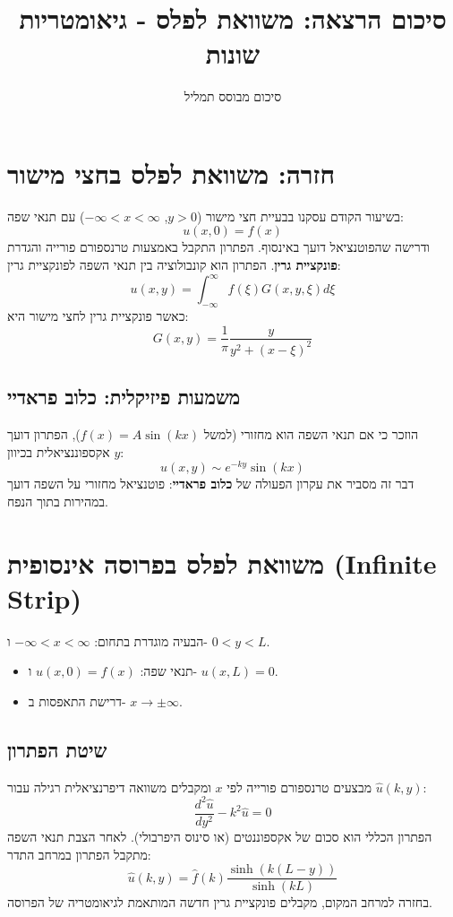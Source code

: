 \documentclass{article}
\title{סיכום הרצאה: משוואת לפלס - גיאומטריות שונות}
\author{סיכום מבוסס תמליל}
\date{}
\begin{document}
\maketitle

\section{חזרה: משוואת לפלס בחצי מישור}
בשיעור הקודם עסקנו בבעיית חצי מישור ($y > 0$, $-\infty < x < \infty$) עם תנאי שפה:
$$ u(x,0) = f(x) $$
ודרישה שהפוטנציאל דועך באינסוף.
הפתרון התקבל באמצעות טרנספורם פורייה והגדרת \textbf{פונקציית גרין}. הפתרון הוא קונבולוציה בין תנאי השפה לפונקציית גרין:
\begin{equation}
    u(x,y) = \int_{-\infty}^{\infty} f(\xi) G(x,y,\xi) d\xi
\end{equation}
כאשר פונקציית גרין לחצי מישור היא:
\begin{equation}
    G(x,y) = \frac{1}{\pi} \frac{y}{y^2 + (x-\xi)^2}
\end{equation}

\subsection{משמעות פיזיקלית: כלוב פראדיי}
הוזכר כי אם תנאי השפה הוא מחזורי (למשל $f(x) = A \sin(kx)$), הפתרון דועך אקספוננציאלית בכיוון $y$:
$$ u(x,y) \sim e^{-ky} \sin(kx) $$
דבר זה מסביר את עקרון הפעולה של \textbf{כלוב פראדיי}: פוטנציאל מחזורי על השפה דועך במהירות בתוך הנפח.

\section{משוואת לפלס בפרוסה אינסופית (Infinite Strip)}
הבעיה מוגדרת בתחום: $-\infty < x < \infty$ ו- $0 < y < L$.
\begin{itemize}
    \item תנאי שפה: $u(x,0) = f(x)$ ו- $u(x,L) = 0$.
    \item דרישת התאפסות ב- $x \to \pm \infty$.
\end{itemize}

\subsection{שיטת הפתרון}
מבצעים טרנספורם פורייה לפי $x$ ומקבלים משוואה דיפרנציאלית רגילה עבור $\hat{u}(k,y)$:
\begin{equation}
    \frac{d^2 \hat{u}}{dy^2} - k^2 \hat{u} = 0
\end{equation}
הפתרון הכללי הוא סכום של אקספוננטים (או סינוס היפרבולי). לאחר הצבת תנאי השפה מתקבל הפתרון במרחב התדר:
\begin{equation}
    \hat{u}(k,y) = \hat{f}(k) \frac{\sinh(k(L-y))}{\sinh(kL)}
\end{equation}
בחזרה למרחב המקום, מקבלים פונקציית גרין חדשה המותאמת לגיאומטריה של הפרוסה.
\end{document}
